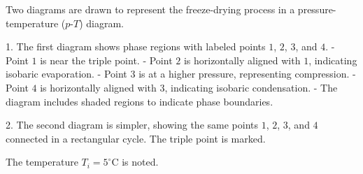 Two diagrams are drawn to represent the freeze-drying process in a pressure-temperature (\( p \)-\( T \)) diagram.  

1. The first diagram shows phase regions with labeled points \( 1 \), \( 2 \), \( 3 \), and \( 4 \).  
   - Point \( 1 \) is near the triple point.  
   - Point \( 2 \) is horizontally aligned with \( 1 \), indicating isobaric evaporation.  
   - Point \( 3 \) is at a higher pressure, representing compression.  
   - Point \( 4 \) is horizontally aligned with \( 3 \), indicating isobaric condensation.  
   - The diagram includes shaded regions to indicate phase boundaries.  

2. The second diagram is simpler, showing the same points \( 1 \), \( 2 \), \( 3 \), and \( 4 \) connected in a rectangular cycle. The triple point is marked.  

The temperature \( T_i = 5^\circ\text{C} \) is noted.